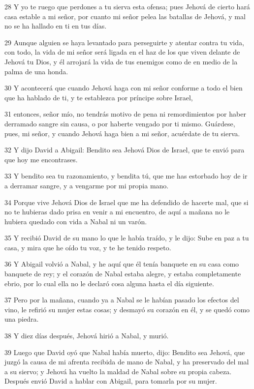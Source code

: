 \par 28 Y yo te ruego que perdones a tu sierva esta ofensa; pues Jehová de cierto hará casa estable a mi señor, por cuanto mi señor pelea las batallas de Jehová, y mal no se ha hallado en ti en tus días.
\par 29 Aunque alguien se haya levantado para perseguirte y atentar contra tu vida, con todo, la vida de mi señor será ligada en el haz de los que viven delante de Jehová tu Dios, y él arrojará la vida de tus enemigos como de en medio de la palma de una honda.
\par 30 Y acontecerá que cuando Jehová haga con mi señor conforme a todo el bien que ha hablado de ti, y te establezca por príncipe sobre Israel,
\par 31 entonces, señor mío, no tendrás motivo de pena ni remordimientos por haber derramado sangre sin causa, o por haberte vengado por ti mismo. Guárdese, pues, mi señor, y cuando Jehová haga bien a mi señor, acuérdate de tu sierva.
\par 32 Y dijo David a Abigail: Bendito sea Jehová Dios de Israel, que te envió para que hoy me encontrases.
\par 33 Y bendito sea tu razonamiento, y bendita tú, que me has estorbado hoy de ir a derramar sangre, y a vengarme por mi propia mano. 
\par 34 Porque vive Jehová Dios de Israel que me ha defendido de hacerte mal, que si no te hubieras dado prisa en venir a mi encuentro, de aquí a mañana no le hubiera quedado con vida a Nabal ni un varón.
\par 35 Y recibió David de su mano lo que le había traído, y le dijo: Sube en paz a tu casa, y mira que he oído tu voz, y te he tenido respeto.
\par 36 Y Abigail volvió a Nabal, y he aquí que él tenía banquete en su casa como banquete de rey; y el corazón de Nabal estaba alegre, y estaba completamente ebrio, por lo cual ella no le declaró cosa alguna hasta el día siguiente.
\par 37 Pero por la mañana, cuando ya a Nabal se le habían pasado los efectos del vino, le refirió su mujer estas cosas; y desmayó su corazón en él, y se quedó como una piedra.
\par 38 Y diez días después, Jehová hirió a Nabal, y murió.
\par 39 Luego que David oyó que Nabal había muerto, dijo: Bendito sea Jehová, que juzgó la causa de mi afrenta recibida de mano de Nabal, y ha preservado del mal a su siervo; y Jehová ha vuelto la maldad de Nabal sobre su propia cabeza. Después envió David a hablar con Abigail, para tomarla por su mujer.
